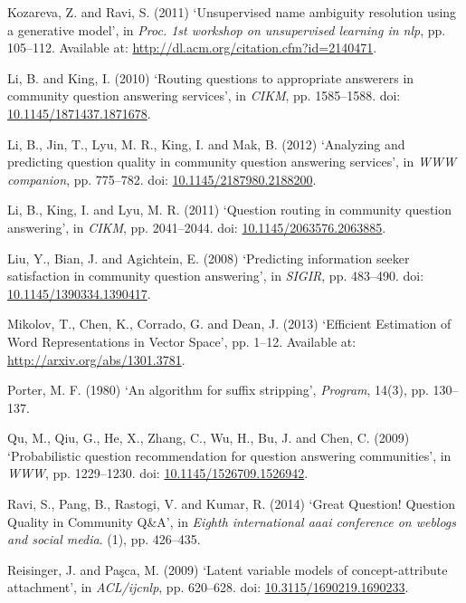 \documentclass[11pt,preprint, authoryear]{article}
\begin{document}
\hypertarget{ref-Kozareva2011}{}
Kozareva, Z. and Ravi, S. (2011) `Unsupervised name ambiguity resolution
using a generative model', in \emph{Proc. 1st workshop on unsupervised
learning in nlp}, pp. 105--112. Available at:
\url{http://dl.acm.org/citation.cfm?id=2140471}.

\hypertarget{ref-Li2010}{}
Li, B. and King, I. (2010) `Routing questions to appropriate answerers
in community question answering services', in \emph{CIKM}, pp.
1585--1588. doi:
\href{https://doi.org/10.1145/1871437.1871678}{10.1145/1871437.1871678}.

\hypertarget{ref-Li2012}{}
Li, B., Jin, T., Lyu, M. R., King, I. and Mak, B. (2012) `Analyzing and
predicting question quality in community question answering services',
in \emph{WWW companion}, pp. 775--782. doi:
\href{https://doi.org/10.1145/2187980.2188200}{10.1145/2187980.2188200}.

\hypertarget{ref-Li2011}{}
Li, B., King, I. and Lyu, M. R. (2011) `Question routing in community
question answering', in \emph{CIKM}, pp. 2041--2044. doi:
\href{https://doi.org/10.1145/2063576.2063885}{10.1145/2063576.2063885}.

\hypertarget{ref-Liu2008}{}
Liu, Y., Bian, J. and Agichtein, E. (2008) `Predicting information
seeker satisfaction in community question answering', in \emph{SIGIR},
pp. 483--490. doi:
\href{https://doi.org/10.1145/1390334.1390417}{10.1145/1390334.1390417}.

\hypertarget{ref-Mikolov2013}{}
Mikolov, T., Chen, K., Corrado, G. and Dean, J. (2013) `Efficient
Estimation of Word Representations in Vector Space', pp. 1--12.
Available at: \url{http://arxiv.org/abs/1301.3781}.

\hypertarget{ref-Porter1980}{}
Porter, M. F. (1980) `An algorithm for suffix stripping',
\emph{Program}, 14(3), pp. 130--137.

\hypertarget{ref-Qu2009}{}
Qu, M., Qiu, G., He, X., Zhang, C., Wu, H., Bu, J. and Chen, C. (2009)
`Probabilistic question recommendation for question answering
communities', in \emph{WWW}, pp. 1229--1230. doi:
\href{https://doi.org/10.1145/1526709.1526942}{10.1145/1526709.1526942}.

\hypertarget{ref-Ravi2014}{}
Ravi, S., Pang, B., Rastogi, V. and Kumar, R. (2014) `Great Question!
Question Quality in Community Q\&A', in \emph{Eighth international aaai
conference on weblogs and social media}. (1), pp. 426--435.

\hypertarget{ref-Reisinger2009}{}
Reisinger, J. and Paşca, M. (2009) `Latent variable models of
concept-attribute attachment', in \emph{ACL/ijcnlp}, pp. 620--628. doi:
\href{https://doi.org/10.3115/1690219.1690233}{10.3115/1690219.1690233}.
\end{document}
